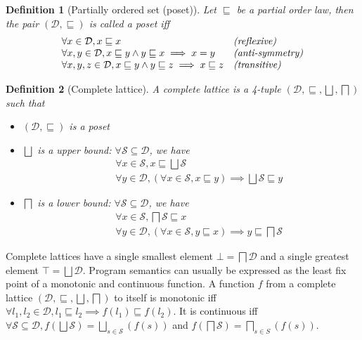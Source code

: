 \documentclass[submission,copyright,creativecommons]{eptcs}
\newtheorem{definition}{Definition}
\newcommand{\treillisc}{\ensuremath{
(\mathcal{D}, \sqsubseteq, \bigsqcup, \bigsqcap)}}
\begin{document}
\begin{definition}[Partially ordered set (poset)]
  Let $\sqsubseteq$ be a partial order law, then
  the pair $(\mathcal{D},\sqsubseteq)$ is called a {\it poset} iff
\begin{displaymath}
\begin{array}{ll}
\forall x \in \mathcal{D}, x \sqsubseteq x & \textrm{\textit{(reflexive)}} \\
\forall x,y \in \mathcal{D}, x \sqsubseteq y \land y \sqsubseteq x \implies x = y & \textrm{\textit{(anti-symmetry)}} \\
\forall x,y,z \in \mathcal{D}, x \sqsubseteq y \land y \sqsubseteq z \implies x \sqsubseteq z & \textrm{\textit{(transitive)}} \\
\end{array}
\end{displaymath}
\end{definition}

\begin{definition}[Complete lattice]
  A complete lattice is a 4-tuple $(\mathcal{D}, \sqsubseteq, \bigsqcup, \bigsqcap)$ such that
\begin{itemize}
\item $(\mathcal{D},\sqsubseteq)$ is a poset 
\item $\bigsqcup$ is a upper bound: $\forall \mathcal{S} \subseteq \mathcal{D}$, we have
  \begin{eqnarray*}
    && \forall x \in \mathcal{S}, x \sqsubseteq \bigsqcup \mathcal{S}\\
    && \forall y \in \mathcal{D},(\forall x \in \mathcal{S}, x \sqsubseteq y) \implies \bigsqcup \mathcal{S} \sqsubseteq y
  \end{eqnarray*}
\item   $\bigsqcap$ is a lower bound: $\forall \mathcal{S} \subseteq \mathcal{D}$, we have
  \begin{eqnarray*}
    && \forall x \in \mathcal{S}, \bigsqcap \mathcal{S}  \sqsubseteq x\\
    && \forall y \in \mathcal{D},(\forall x \in \mathcal{S}, y \sqsubseteq x) \implies y  \sqsubseteq \bigsqcap \mathcal{S}
  \end{eqnarray*}
\end{itemize}
\end{definition}
\noindent 
Complete lattices have a single smallest element $\bot = \bigsqcap \mathcal{D}$ 
and a single greatest element $\top = \bigsqcup \mathcal{D}$. 
Program semantics can usually be expressed as the least fix point of a monotonic and continuous function.
A function $f$ from a complete lattice $\treillisc$ to itself is monotonic iff 
$\forall l_1,l_2 \in \mathcal{D}, l_1 \sqsubseteq l_2 \implies f(l_1) \sqsubseteq f(l_2)$.
It is continuous iff
$\forall \mathcal{S} \subseteq \mathcal{D}, f(\bigsqcup
\mathcal{S}) = \bigsqcup_{s \in \mathcal{S}}(f(s))$ and 
$f(\bigsqcap \mathcal{S})= \bigsqcap_{s \in S}(f(s))$. 
\end{document}
